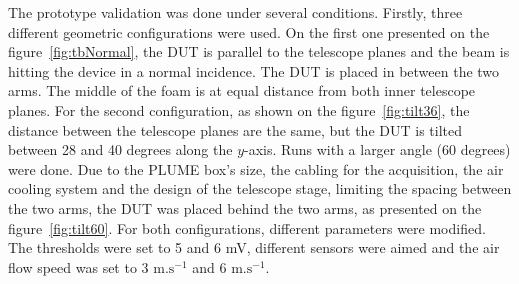     The prototype validation was done under several conditions.
    Firstly, three different geometric configurations were used.
    On the first one presented on the figure~\ref{fig:tbNormal}, the \gls{DUT} is parallel to the telescope planes and the beam is hitting the device in a normal incidence.
    The \gls{DUT} is placed in between the two arms.
    The middle of the foam is at equal distance from both inner telescope planes.
    For the second configuration, as shown on the figure~\ref{fig:tilt36}, the distance between the telescope planes are the same, but the \gls{DUT} is tilted between 28 and 40 degrees along the $y$-axis.
    Runs with a larger angle (60 degrees) were done.
    Due to the PLUME box's size, the cabling for the acquisition, the air cooling system and the design of the telescope stage, limiting the spacing between the two arms, the \gls{DUT} was placed behind the two arms, as presented on the figure~\ref{fig:tilt60}.
    For both configurations, different parameters were modified.
    The thresholds were set to 5 and 6 mV, different sensors were aimed and the air flow speed was set to 3 $\text{m.s}^{-1}$ and 6 $\text{m.s}^{-1}$.

